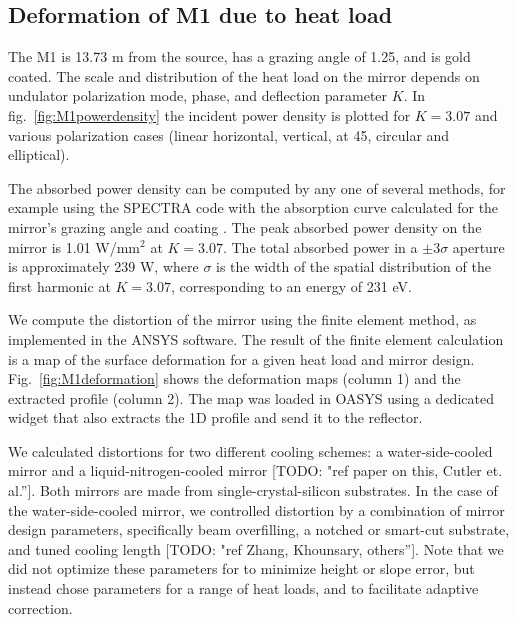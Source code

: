 \documentclass[]{spie}  %
\newcommand{\todo}[1]{{\color{red}[TODO: "#1'']}}
\begin{document}
\subsection{Deformation of M1 due to heat load}



The M1 is 13.73 m from the source, has a grazing angle of 1.25\textdegree, and is gold coated. The scale and distribution of the heat load on the mirror depends on undulator polarization mode, phase, and deflection parameter $K$. In fig.~\ref{fig:M1powerdensity} the incident power density is plotted for $K=3.07$ and various polarization cases (linear horizontal, vertical, at 45\textdegree, circular and elliptical).

The absorbed power density can be computed by any one of several methods, for example using the SPECTRA code with the absorption curve calculated for the mirror's grazing angle and coating \cite{codeSPECTRA}.  The peak absorbed power density on the mirror is 1.01 W/mm$^2$ at $K=3.07$. The total absorbed power in a $\pm 3 \sigma$ aperture is approximately 239 W, where $\sigma$ is the width of the spatial distribution of the first harmonic at $K=3.07$, corresponding to an energy of 231 eV.  %

We compute the distortion of the mirror using the finite element method, as implemented in the ANSYS software. The result of the finite element calculation is a map of the surface deformation for a given heat load and mirror design. Fig.~\ref{fig:M1deformation} shows the deformation maps (column 1) and the extracted profile (column 2). The map was loaded in OASYS using a dedicated widget that also extracts the 1D profile and send it to the reflector.

We calculated distortions for two different cooling schemes: a water-side-cooled mirror and a liquid-nitrogen-cooled mirror \todo{ref paper on this, Cutler et. al.}. Both mirrors are made from single-crystal-silicon substrates. In the case of the water-side-cooled mirror, we controlled distortion by a combination of mirror design parameters, specifically beam overfilling, a notched or smart-cut substrate, and tuned cooling length \todo{ref Zhang, Khounsary, others}.  Note that we did not optimize these parameters for to minimize height or slope error, but instead chose parameters for a range of heat loads, and to facilitate adaptive correction.
\end{document}
